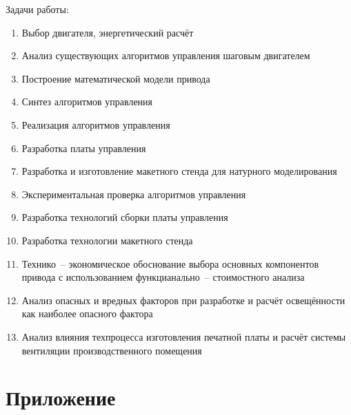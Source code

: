 \documentclass[a4paper, 14pt]{extarticle}
\begin{document}
\setcounter{page}{5}

\tableofcontents

\newpage


\newpage
Задачи работы:
\begin{enumerate}
    \item Выбор двигателя, энергетический расчёт
    \item Анализ существующих алгоритмов управления шаговым двигателем
    \item Построение математической модели привода
    \item Синтез алгоритмов управления
    \item Реализация алгоритмов управления
    \item Разработка платы управления
    \item Разработка и изготовление макетного стенда для натурного моделирования
    \item Экспериментальная проверка алгоритмов управления
    \item Разработка технологий сборки платы управления
    \item Разработка технологии макетного стенда
    \item Технико~-- экономическое обоснование выбора основных компонентов
        привода с использованием функцианально~-- стоимостного анализа
    \item Анализ опасных и вредных факторов при разработке и расчёт освещённости
        как наиболее опасного фактора
    \item Анализ влияния техпроцесса изготовления печатной платы и расчёт системы
        вентиляции производственного помещения
\end{enumerate}









\clearpage
\section{Приложение}
\subsection[Список иллюстраций]{}
\listoffigures
\clearpage
\subsection[Список таблиц]{}
\listoftables


\end{document}
